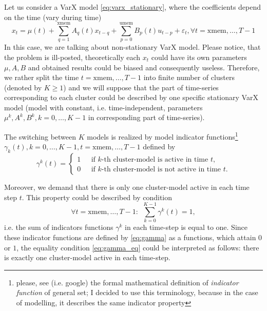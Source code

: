  Let us consider a VarX model \eqref{eq:varx_stationary}, where the coefficients depend on the time (vary during time)
 \begin{equation}
  \label{eq:varx_nonstationary}
	x_t = \mu(t) + \sum\limits_{q=1}^{\mathrm{xmem}} A_q(t) x_{t-q} + \sum\limits_{p=0}^{\mathrm{umem}} B_p(t) u_{t-p} + \varepsilon_t, \forall t = \mathrm{xmem}, \dots, T-1
 \end{equation}
 In this case, we are talking about non-stationary VarX model. Please notice, that the problem is ill-posted, theoretically each $x_t$ could have its own parameters $\mu,A,B$ and
 obtained results could be biased and consequently useless. Therefore, we rather split the time $t=\mathrm{xmem},\dots,T-1$ into finite number of clusters (denoted by $K \geq 1$)
 and we will suppose that the part of time-series corresponding to each cluster could be described by one specific stationary VarX model (model with constant, i.e. time-independent, parameters $\mu^k,A^k,B^k, k = 0,\dots,K-1$ in corresponding part of time-series). \newline
 
 The switching between $K$ models is realized by model indicator functions\footnote{please, see (i.e. google) the formal mathematical definition of \emph{indicator function} of general set; I decided to use this terminology, because in the case of modelling, it describes the same indicator property}
 $\gamma_k(t), k=0,\dots,K-1, t = \mathrm{xmem},\dots,T-1$ defined by
 \begin{equation}
  \label{eq:gamma}
  \gamma^k(t) =
  \left\lbrace
   \begin{array}{ll}
    1 ~~~ & \textrm{if $k$-th cluster-model is active in time $t$,} \\
    0 ~~~ & \textrm{if $k$-th cluster-model is not active in time $t$.}
   \end{array}
  \right.
 \end{equation} 

 Moreover, we demand that there is only one cluster-model active in each time step $t$. This property could be described by condition
 \begin{equation}
  \label{eq:gamma_eq}
  \forall t = \mathrm{xmem}, \dots, T-1: ~~ \sum\limits_{k=0}^{K-1} \gamma^k (t) = 1,
 \end{equation}
 i.e. the sum of indicators functions $\gamma^k$ in each time-step is equal to one. Since these indicator functions are defined by \eqref{eq:gamma}
 as a functions, which attain $0$ or $1$, the equality condition \eqref{eq:gamma_eq} could be interpreted as follows: there is exactly one cluster-model
 active in each time-step.
 
